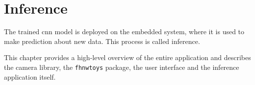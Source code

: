 \chapter{Inference}
\thispagestyle{plain}
\label{ch:inference}

The trained \acrlong{cnn} model is deployed on the embedded system, where it is used to make prediction about new data.
This process is called inference.

This chapter provides a high-level overview of the entire application and describes the camera library, the \texttt{fhnwtoys} package, the user interface and the inference application itself.







